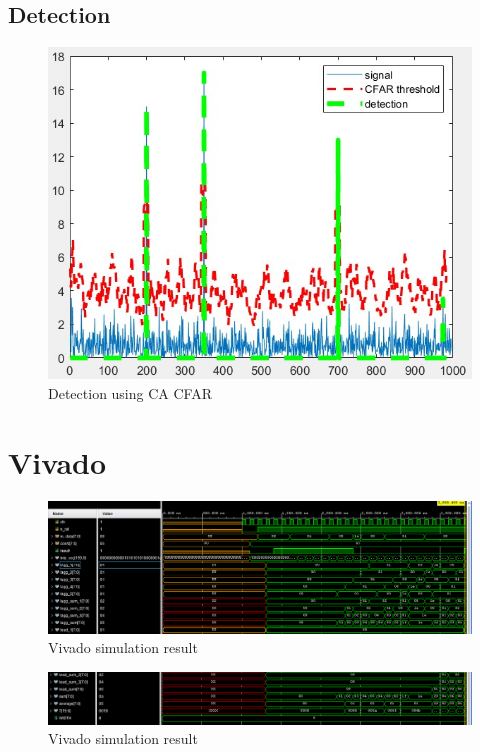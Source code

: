 \documentclass[10pt]{report}
\begin{document}
\subsection{Detection}
 \begin{figure}[h]
	\centering
	\includegraphics{sim2.jpg}
	\caption{Detection using CA CFAR}
\end{figure}
\newpage\section{Vivado}
 \begin{figure}[h]
	\centering
	\includegraphics[width=180mm,scale=2]{final1.png}
	\caption{Vivado simulation result}
\end{figure}
\begin{figure}[h]
	\centering
	\includegraphics[width=180mm,scale=2]{final2.png}
	\caption{Vivado simulation result}
\end{figure}
\end{document}
